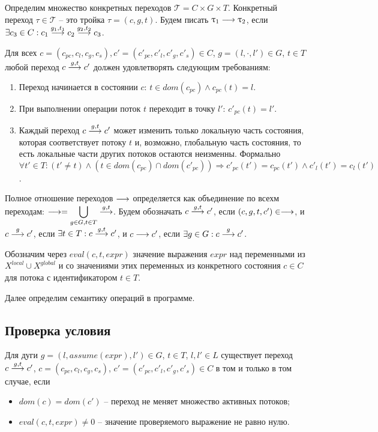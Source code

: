 Определим множество конкретных переходов $\mathcal{T}=C\times G \times T$.
Конкретный переход $\tau \in \mathcal{T}$ -- это тройка $\tau = (c, g, t)$. 
Будем писать $\uptau_1 \longrightarrow \uptau_2$, если $\exists c_3 \in C: c_1 \stackrel{g_1, t_1}{\longrightarrow} c_2 \stackrel{g_2, t_2}{\longrightarrow} c_3$.

Для всех $c=(c_{pc}, c_l, c_g, c_s), c'=(c'_{pc}, c'_l, c'_g, c'_s) \in C$, $g = (l, \cdot, l')\in G$, $t\in T$ любой переход $c \stackrel{g, t}{\longrightarrow} c'$ должен удовлетворять следующим требованиям:
\begin{enumerate}
\item Переход начинается в состоянии $c$: $t\in dom(c_{pc}) \land c_{pc}(t)=l$.
\item При выполнении операции поток $t$ переходит в точку $l'$: $c'_{pc}(t)=l'$.
\item Каждый переход $c \stackrel{g,t}{\longrightarrow} c'$ может изменить только локальную часть состояния, которая соответствует потоку $t$ и, возможно, глобальную часть состояния, то есть локальные части других потоков остаются неизменны.
Формально
$\forall t'\in T: (t'\neq t) \land (t \in dom(c_{pc})\cap dom(c'_{pc})) \Rightarrow c'_{pc}(t')=c_{pc}(t') \land c'_l(t')=c_l(t')$.
\end{enumerate}

Полное отношение переходов $\longrightarrow$ определяется как объединение по всехм переходам: 
$\longrightarrow = \displaystyle\bigcup_{g \in G,t \in T} \stackrel{g,t}{\longrightarrow}$.
Будем обозначать $c \stackrel{g, t}{\longrightarrow} c'$, если $(c, g, t, c') \in \longrightarrow$, и
$c \stackrel{g}{\longrightarrow} c'$, если $\exists t\in T: c \stackrel{g,t}{\longrightarrow} c'$, и 
$c \longrightarrow c'$, если $\exists g\in G: c \stackrel{g}{\longrightarrow} c'$. 

Обозначим через $eval(c, t, expr)$ значение выражения $expr$ над переменными из $X^{local} \cup X^{global}$ и со значениями этих переменных из конкретного состояния $c \in C$ для потока с идентификатором $t \in T$. %

Далее определим семантику операций в программе.

\subsection{Проверка условия}
Для дуги $g = (l, assume(expr), l') \in G$, $t\in T$, $l, l' \in L$ существует переход $c \stackrel{g, t}{\longrightarrow} c'$, $c=(c_{pc}, c_l, c_g, c_s)$, $c'=(c'_{pc}, c'_l, c'_g, c'_s) \in C$ в том и только в том случае, если
\begin{itemize}
\item $dom(c)=dom(c')$ -- переход не меняет множество активных потоков;
\item $eval(c, t, expr) \neq 0$ -- значение проверяемого выражение не равно нулю.
\end{itemize}

